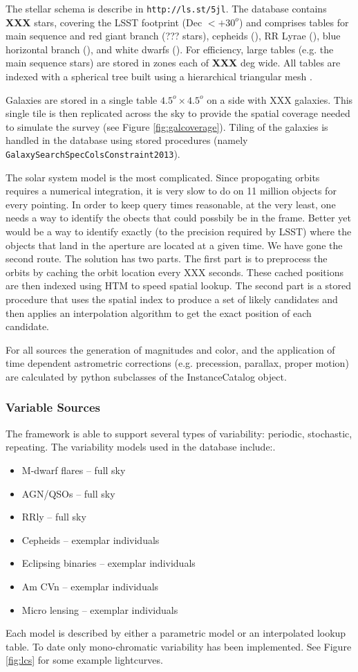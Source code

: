 \documentclass[]{article}
\begin{document}
{The stellar schema is describe in {\tt http://ls.st/5jl}.  The database contains {\bf XXX} stars, covering the LSST footprint (Dec $< +30^o$)
and comprises tables for main sequence and red giant branch (??? stars), cepheids (), RR Lyrae (), blue horizontal branch (), and white dwarfs ().
For efficiency, large tables (e.g. the main sequence stars) are stored in zones each of {\bf XXX} deg wide.  All tables are indexed with a spherical
tree built using a hierarchical triangular mesh \citep[HTM][]{htm}. 

Galaxies are stored in a single table $4.5^o \times 4.5^o$ on a side with XXX galaxies. This single tile is then replicated across the sky to 
provide the spatial coverage needed to simulate the survey (see Figure \ref{fig:galcoverage}).  
Tiling of the galaxies is handled in the database using stored procedures (namely {\tt GalaxySearchSpecColsConstraint2013}).

The solar system model is the most complicated.  Since propogating orbits requires a numerical integration, it is very slow to do on 
11 million objects for every pointing.  In order to keep query times reasonable, at the very least, one needs a way to 
identify the obects that could possbily be in the frame.  Better yet would be a way to identify exactly (to the precision
required by LSST) where the objects that land in the aperture are located at a given time.  We have gone the second route.
The solution has two parts.  The first part is to preprocess the orbits by caching the orbit location every XXX seconds. 
These cached positions are then indexed using HTM to speed spatial lookup.
The second part is a stored procedure that uses the spatial index to produce a set of likely candidates and then applies
an interpolation algorithm to get the exact position of each candidate.

For all sources the generation of magnitudes and color, and the application of time dependent astrometric corrections (e.g. 
precession, parallax, proper motion) are calculated by python subclasses of the InstanceCatalog object.

\subsubsection{Variable Sources}
The framework is able to support several types of variability: periodic, stochastic, repeating.
The variability models used in the database include:.  
\begin{itemize}
\item M-dwarf flares -- full sky
\item AGN/QSOs -- full sky
\item RRly -- full sky
\item Cepheids -- exemplar individuals
\item Eclipsing binaries -- exemplar individuals
\item Am CVn -- exemplar individuals
\item Micro lensing -- exemplar individuals
\end{itemize}
Each model is described by either a parametric model or an interpolated lookup table.  To date only mono-chromatic variability has been implemented.
See Figure \ref{fig:lcs} for some example lightcurves.

}
\end{document}
